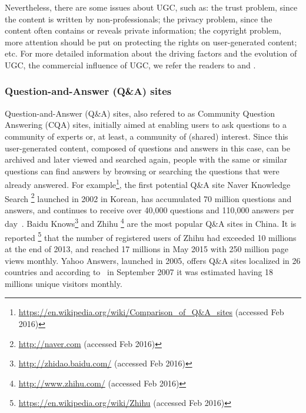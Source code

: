 Nevertheless, there are some issues \cite{balasubramaniam2009user} about UGC, such as: the trust problem, since the content is written by non-professionals; the privacy problem, since the content often contains or reveals private information; the copyright problem, more attention should be put on protecting the rights on user-generated content; etc.
For more detailed information about the driving factors and the evolution of UGC, the commercial influence of UGC, we refer the readers to \cite{balasubramaniam2009user} and \cite{smith2012does}.

\subsubsection{Question-and-Answer (Q\&A) sites}

Question-and-Answer (Q\&A) sites, also refered to as Community Question Answering (CQA) sites, initially aimed at enabling users to ask questions to a community of experts or, at least, a community of (shared) interest. Since this user-generated content, composed of questions and answers in this case, can be archived and later viewed and searched again, people with the same or similar questions can find answers by browsing or searching the questions that were already answered. For example\footnote{\url{https://en.wikipedia.org/wiki/Comparison_of_Q\&A_sites} (accessed Feb 2016)},
the first potential Q\&A site Naver Knowledge Search \footnote{\url{http://naver.com} (accessed Feb 2016)} launched in 2002 in Korean, has accumulated 70 million questions and answers, and continues to receive over 40,000 questions and 110,000 answers per day~\cite{sanghunnewyork}. Baidu Knows\footnote{\url{http://zhidao.baidu.com/} (accessed Feb 2016)} and Zhihu \footnote{\url{http://www.zhihu.com/} (accessed Feb 2016)} are the most popular Q\&A sites in China. It is reported \footnote{\url{https://en.wikipedia.org/wiki/Zhihu} (accessed Feb 2016)} that the number of registered users of Zhihu had exceeded 10 millions at the end of 2013, and reached 17 millions in May 2015 with 250 million page views monthly. Yahoo Answers, launched in 2005, offers Q\&A sites localized in 26 countries and according to~\cite{Harper:2008:PAQ:1357054.1357191} in September 2007 it was estimated having 18 millions unique visitors monthly.


